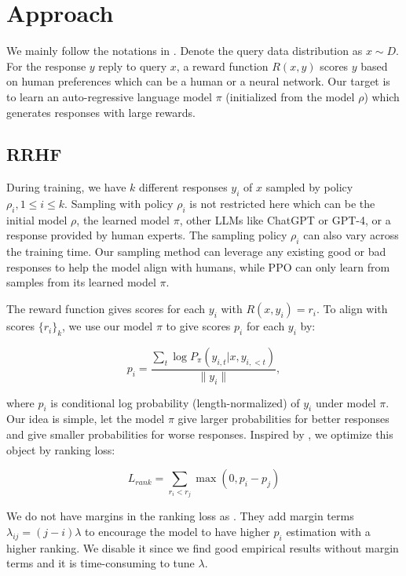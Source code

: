 \section{Approach}
We mainly follow the notations in \citet{ziegler2019fine}.
Denote the query data distribution as $x\sim D$. For the response $y$ reply to query $x$, a reward function $R(x,y)$ scores $y$ based on human preferences which can be a human or a neural network. Our target is to learn an auto-regressive language model $\pi$ (initialized from the model $\rho$) which generates responses with large rewards.

\subsection{RRHF}
During training, we have $k$ different responses $y_i$ of $x$ sampled by policy $\rho_i, 1\leq i \leq k$. Sampling with policy $\rho_i$ is not restricted here which can be the initial model $\rho$, the learned model $\pi$, other LLMs like ChatGPT or GPT-4, or a response provided by human experts. The sampling policy $\rho_i$ can also vary across the training time. Our sampling method can leverage any existing good or bad responses to help the model align with humans, while PPO can only learn from samples from its learned model $\pi$.

The reward function gives scores for each $y_i$ with $R(x,y_i)=r_i$. To align with scores $\{r_i\}_k$, we use our model $\pi$ to give scores $p_i$ for each $y_i$ by:

\begin{equation}
    p_i = \frac{\sum_t \log P_\pi(y_{i,t}|x,y_{i,<t})}{\|y_i\|},
\end{equation}

where $p_i$ is conditional log probability (length-normalized) of $y_i$ under model $\pi$.
Our idea is simple, let the model $\pi$ give larger probabilities for better responses and give smaller probabilities for worse responses. Inspired by \citet{liu-etal-2022-brio}, we optimize this object by ranking loss:

\begin{equation}
    L_{rank} = \sum_{r_i<r_j}\max(0,p_i-p_j)
\end{equation}

We do not have margins in the ranking loss as \citet{liu-etal-2022-brio}. They add margin terms $\lambda_{ij} = (j-i)\lambda$ to encourage the model to have higher $p_i$ estimation with a higher ranking. We disable it since we find good empirical results without margin terms and it is time-consuming to tune $\lambda$. 

